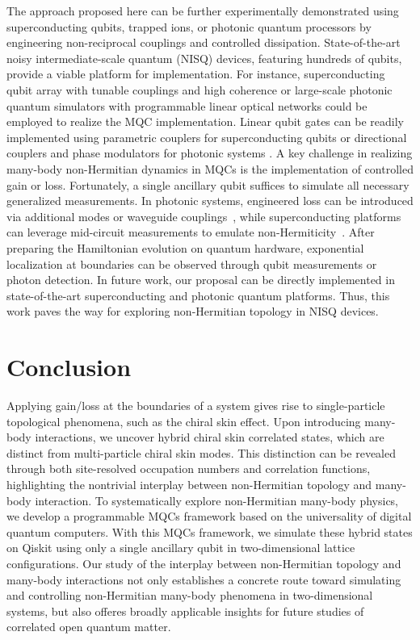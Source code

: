 \documentclass[longbibliography, aps, prx, amsmath, amssymb, amsfonts, twocolumn,superscriptaddress, footinbib]{revtex4-1}
\begin{document}
	The approach proposed here can be further experimentally demonstrated using superconducting qubits, trapped ions, or photonic quantum processors by engineering non-reciprocal couplings and controlled dissipation. State-of-the-art noisy intermediate-scale quantum (NISQ) devices, featuring hundreds of qubits, provide a viable platform for implementation. For instance, superconducting qubit array with tunable couplings and high coherence \cite{guo2021observation, preskill2018quantum, wu2021strong} or large-scale photonic quantum simulators with programmable linear optical networks \cite{zhong2020quantum, madsen2022quantum, zhu2024dynamically} could be employed to realize the MQC implementation. Linear qubit gates can be readily implemented using parametric couplers for superconducting qubits or directional couplers and phase modulators for photonic systems \cite{zhu2024large}. A key challenge in realizing many-body non-Hermitian dynamics in MQCs is the implementation of controlled gain or loss. Fortunately, a single ancillary qubit suffices to simulate all necessary generalized measurements. In photonic systems, engineered loss can be introduced via additional modes or waveguide couplings~\cite{hoch2025quantum, carolan2020variational}, while superconducting platforms can leverage mid-circuit measurements to emulate non-Hermiticity~\cite{shen2024enhanced,shen2025observation}. After preparing the Hamiltonian evolution on quantum hardware, exponential localization at boundaries can be observed through qubit measurements or photon detection.  In future work, our proposal can be directly implemented in state-of-the-art superconducting and photonic quantum platforms. Thus, this work paves the way for exploring non-Hermitian topology in NISQ devices.

	\section{Conclusion}
	Applying gain/loss at the boundaries of a system gives rise to single-particle topological phenomena, such as the chiral skin effect. Upon introducing many-body interactions, we uncover hybrid chiral skin correlated states, which are distinct from multi-particle chiral skin modes. This distinction can be revealed through both site-resolved occupation numbers and correlation functions, highlighting the nontrivial interplay between non-Hermitian topology and many-body interaction. 
	To systematically explore non-Hermitian many-body physics, we develop a programmable MQCs framework based on the universality of digital quantum computers. 
	With this MQCs framework, we simulate these hybrid states on Qiskit using only a single ancillary qubit in two-dimensional lattice configurations. 
	Our study of the interplay between non-Hermitian topology and many-body interactions not only establishes a concrete route toward simulating and controlling non-Hermitian many-body phenomena in two-dimensional systems, but also offeres broadly applicable insights for future studies of correlated open quantum matter.
\end{document}
